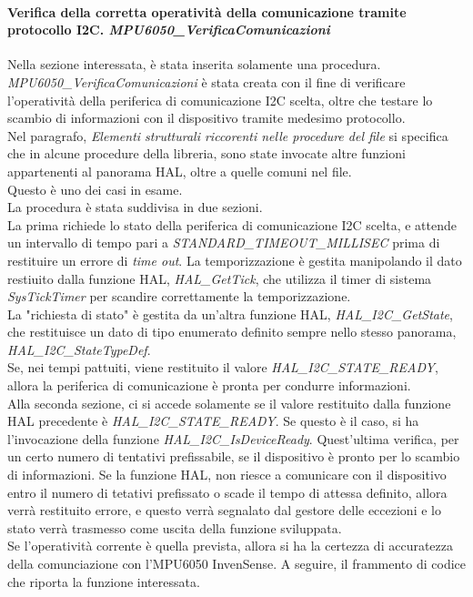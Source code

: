 \documentclass[11pt]{report}
\begin{document}
\paragraph{Verifica della corretta operatività della comunicazione tramite protocollo I2C. \textit{MPU6050\_VerificaComunicazioni}}
Nella sezione interessata, è stata inserita solamente una procedura. \textit{MPU6050\_VerificaComunicazioni} è stata creata con il fine di verificare l'operatività della periferica di comunicazione I2C scelta, oltre che testare lo scambio di informazioni con il dispositivo tramite medesimo protocollo.\\
Nel paragrafo, \textit{Elementi strutturali riccorenti nelle procedure del file} si specifica che in alcune procedure della libreria, sono state invocate altre funzioni appartenenti al panorama HAL, oltre a quelle comuni nel file.\\
Questo è uno dei casi in esame.\\
La procedura è stata suddivisa in due sezioni.\\
La prima richiede lo stato della periferica di comunicazione I2C scelta, e attende un intervallo di tempo pari a \textit{STANDARD\_TIMEOUT\_MILLISEC} prima di restituire un errore di \textit{time out}. La temporizzazione è gestita manipolando il dato restiuito dalla funzione HAL, \textit{HAL\_GetTick}, che utilizza il timer di sistema \textit{SysTickTimer} per scandire correttamente la temporizzazione.\\
La "richiesta di stato" è gestita da un'altra funzione HAL, \textit{HAL\_I2C\_GetState}, che restituisce un dato di tipo enumerato definito sempre nello stesso panorama, \textit{HAL\_I2C\_StateTypeDef}.\\
Se, nei tempi pattuiti, viene restituito il valore \textit{HAL\_I2C\_STATE\_READY}, allora la periferica di comunicazione è pronta per condurre informazioni.\\
Alla seconda sezione, ci si accede solamente se il valore restituito dalla funzione HAL precedente è \textit{HAL\_I2C\_STATE\_READY}. Se questo è il caso, si ha l'invocazione della funzione \textit{HAL\_I2C\_IsDeviceReady}. Quest'ultima verifica, per un certo numero di tentativi prefissabile, se il dispositivo è pronto per lo scambio di informazioni. Se la funzione HAL, non riesce a comunicare con il dispositivo entro il numero di tetativi prefissato o scade il tempo di attessa definito, allora verrà restituito errore, e questo verrà segnalato dal gestore delle eccezioni e lo stato verrà trasmesso come uscita della funzione sviluppata.\\
Se l'operatività corrente è quella prevista, allora si ha la certezza di accuratezza della comunciazione con l'MPU6050 InvenSense.
A seguire, il frammento di codice che riporta la funzione interessata.

\end{document}
